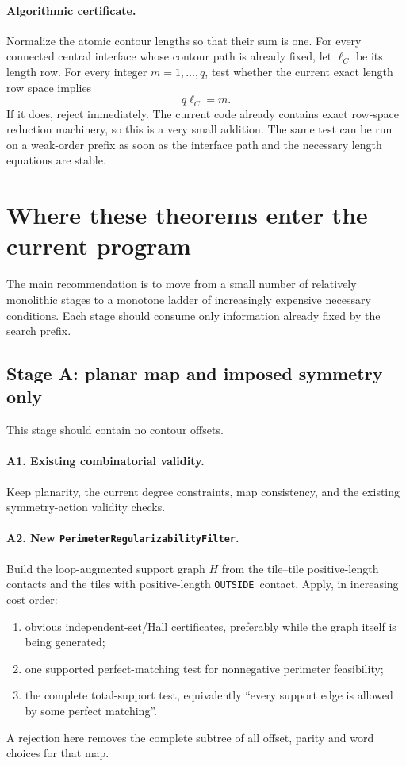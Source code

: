 \documentclass[11pt]{article}
\theoremstyle{definition}
\theoremstyle{remark}
\newcommand{\OUT}{\texttt{OUTSIDE}}
\begin{document}
\paragraph{Algorithmic certificate.}
Normalize the atomic contour lengths so that their sum is one.  For every connected central interface whose contour path is already fixed, let $\ell_C$ be its length row.  For every integer $m=1,\ldots,q$, test whether the current exact length row space implies
\[
  q\ell_C=m.
\]
If it does, reject immediately.  The current code already contains exact row-space reduction machinery, so this is a very small addition.  The same test can be run on a weak-order prefix as soon as the interface path and the necessary length equations are stable.

\section{Where these theorems enter the current program}
\label{sec:pipeline}

The main recommendation is to move from a small number of relatively monolithic stages to a monotone ladder of increasingly expensive necessary conditions.  Each stage should consume only information already fixed by the search prefix.

\subsection{Stage A: planar map and imposed symmetry only}

This stage should contain no contour offsets.

\paragraph{A1. Existing combinatorial validity.}
Keep planarity, the current degree constraints, map consistency, and the existing symmetry-action validity checks.

\paragraph{A2. New \texttt{PerimeterRegularizabilityFilter}.}
Build the loop-augmented support graph $H$ from the tile--tile positive-length contacts and the tiles with positive-length \OUT\ contact.  Apply, in increasing cost order:
\begin{enumerate}
\item obvious independent-set/Hall certificates, preferably while the graph itself is being generated;
\item one supported perfect-matching test for nonnegative perimeter feasibility;
\item the complete total-support test, equivalently ``every support edge is allowed by some perfect matching''.
\end{enumerate}
A rejection here removes the complete subtree of all offset, parity and word choices for that map.
\end{document}
